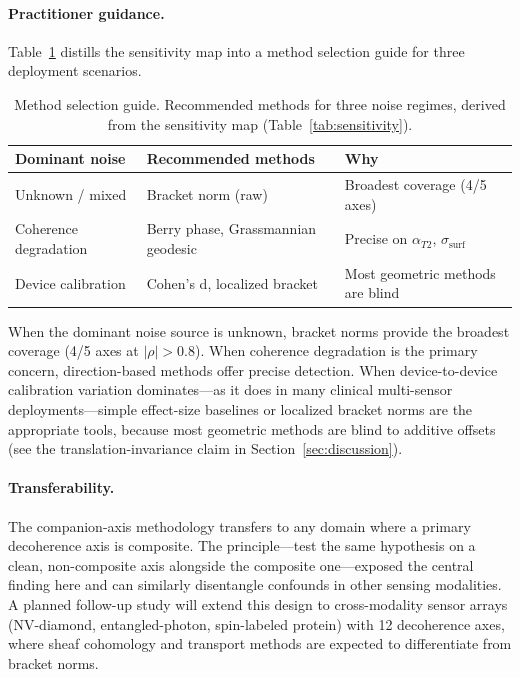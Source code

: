 \documentclass[11pt]{article}
\begin{document}
\paragraph{Practitioner guidance.}
Table~\ref{tab:guide} distills the sensitivity map into a method
selection guide for three deployment scenarios.

\begin{table}[h]
\centering
\caption{Method selection guide.  Recommended methods for three
  noise regimes, derived from the sensitivity map
  (Table~\ref{tab:sensitivity}).}
\label{tab:guide}
\small
\begin{tabular}{@{}lll@{}}
\toprule
Dominant noise & Recommended methods & Why \\
\midrule
Unknown / mixed & Bracket norm (raw) & Broadest coverage (4/5 axes) \\
Coherence degradation & Berry phase, Grassmannian geodesic & Precise on $\alpha_{T2}$, $\sigma_\text{surf}$ \\
Device calibration & Cohen's d, localized bracket & Most geometric methods are blind \\
\bottomrule
\end{tabular}
\end{table}

When the dominant noise source is unknown, bracket norms provide the
broadest coverage (4/5 axes at $|\rho| > 0.8$).  When coherence
degradation is the primary concern, direction-based methods offer
precise detection.  When device-to-device calibration variation
dominates---as it does in many clinical multi-sensor
deployments---simple effect-size baselines or localized bracket norms
are the appropriate tools, because most geometric methods are blind to
additive offsets (see the translation-invariance claim in
Section~\ref{sec:discussion}).

\paragraph{Transferability.}
The companion-axis methodology transfers to any domain where a primary
decoherence axis is composite.  The principle---test the same hypothesis
on a clean, non-composite axis alongside the composite one---exposed the
central finding here and can similarly disentangle confounds in other
sensing modalities.  A planned follow-up study will extend this design to
cross-modality sensor arrays (NV-diamond, entangled-photon, spin-labeled
protein) with 12 decoherence axes, where sheaf cohomology and transport
methods are expected to differentiate from bracket norms.
\end{document}
